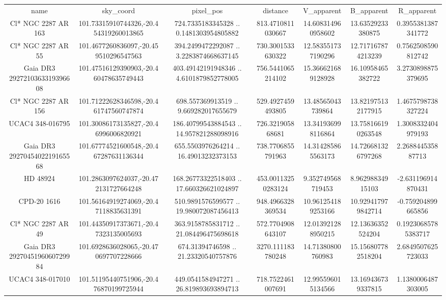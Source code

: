 \begin{table}
\begin{tabular}{ccccccc}
name & sky_coord & pixel_pos & distance & V_apparent & B_apparent & R_apparent \\
Cl* NGC 2287     AR     163 & 101.73315910744326,-20.454319260013865 & 724.7335183345328 .. 0.1481303954805882 & 813.4710811030667 & 14.608314960958602 & 13.63529233380875 & 0.3955381387341772 \\
Cl* NGC 2287     AR      55 & 101.4677260836097,-20.459510296547563 & 394.2499472292087 .. 3.2283874668637145 & 730.3001533630322 & 12.583551737190296 & 12.717167874213239 & 0.7562508590812742 \\
Gaia DR3 2927210363319396608 & 101.47516129390903,-20.460478635749443 & 403.49142191948346 .. 4.6101879852778005 & 756.5441065214102 & 15.366621689128928 & 16.10958465382722 & 3.2730898875379695 \\
Cl* NGC 2287     AR     156 & 101.71222628346598,-20.461747560747874 & 698.557369913519 .. 9.669282017655679 & 529.4927459493805 & 13.48565043739864 & 13.821975132177915 & 1.4675798738327224 \\
UCAC4 348-016795 & 101.30086173135827,-20.46996006820921 & 186.40799543884543 .. 14.957821288098916 & 726.321905868681 & 13.341936998116864 & 13.758166190263548 & 1.3008332404979193 \\
Gaia DR3 2927045402219165568 & 101.67774521600548,-20.467287631136344 & 655.5503976264214 .. 16.49013232373153 & 738.7706855791963 & 14.314285865563173 & 14.726681326797268 & 2.268844535887713 \\
HD  48924 & 101.2863097624037,-20.472131727664248 & 168.26773322518403 .. 17.660326621024897 & 453.00113250283124 & 9.352749568719453 & 8.96298834915103 & -2.631196914870431 \\
CPD-20  1616 & 101.56164919274069,-20.47118835631391 & 510.9891576599577 .. 19.980072087456413 & 948.4966328369534 & 10.961254189253166 & 10.929417979842714 & -0.759204899665856 \\
Cl* NGC 2287     AR      49 & 101.44350917373671,-20.47323135005693 & 363.9158785831712 .. 21.084496475698618 & 572.7704908643107 & 12.013921288950215 & 12.13636352524204 & 0.19230685785383717 \\
Gaia DR3 2927045196060729984 & 101.6928636028065,-20.470697707228666 & 674.31394746598 .. 21.23320540757876 & 3270.111183780248 & 14.71380800760983 & 15.156807782518204 & 2.6849507625723033 \\
UCAC4 348-017010 & 101.51195440751906,-20.476870199725944 & 449.0541584947271 .. 26.819893693894713 & 718.7522461007691 & 12.995596015134566 & 13.169436739337815 & 1.1380006487303005 \\

\end{tabular}
\end{table}
